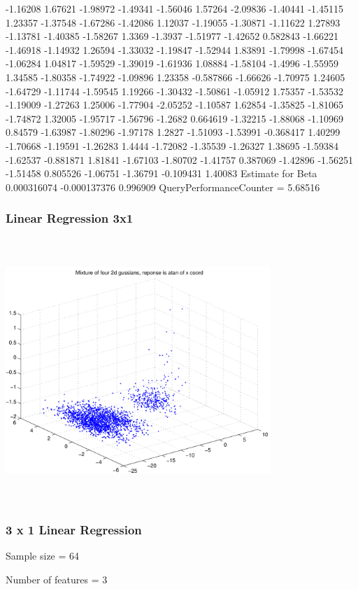 \documentclass[9pt]{article}
\theoremstyle{plain}
\theoremstyle{definition}
\theoremstyle{remark}
\numberwithin{equation}{section}
\begin{document}
-1.16208
1.67621
-1.98972
-1.49341
-1.56046
1.57264
-2.09836
-1.40441
-1.45115
1.23357
-1.37548
-1.67286
-1.42086
1.12037
-1.19055
-1.30871
-1.11622
1.27893
-1.13781
-1.40385
-1.58267
1.3369
-1.3937
-1.51977
-1.42652
0.582843
-1.66221
-1.46918
-1.14932
1.26594
-1.33032
-1.19847
-1.52944
1.83891
-1.79998
-1.67454
-1.06284
1.04817
-1.59529
-1.39019
-1.61936
1.08884
-1.58104
-1.4996
-1.55959
1.34585
-1.80358
-1.74922
-1.09896
1.23358
-0.587866
-1.66626
-1.70975
1.24605
-1.64729
-1.11744
-1.59545
1.19266
-1.30432
-1.50861
-1.05912
1.75357
-1.53532
-1.19009
-1.27263
1.25006
-1.77904
-2.05252
-1.10587
1.62854
-1.35825
-1.81065
-1.74872
1.32005
-1.95717
-1.56796
-1.2682
0.664619
-1.32215
-1.88068
-1.10969
0.84579
-1.63987
-1.80296
-1.97178
1.2827
-1.51093
-1.53991
-0.368417
1.40299
-1.70668
-1.19591
-1.26283
1.4444
-1.72082
-1.35539
-1.26327
1.38695
-1.59384
-1.62537
-0.881871
1.81841
-1.67103
-1.80702
-1.41757
0.387069
-1.42896
-1.56251
-1.51458
0.805526
-1.06751
-1.36791
-0.109431
1.40083
Estimate for Beta
0.000316074
-0.000137376
0.996909
QueryPerformanceCounter  =  5.68516
\subsubsection{Linear Regression 3x1}
\includegraphics[width=10.0cm,height=10.0cm]{AtanDataSet.pdf}

\subsubsection{3 x 1 Linear Regression}
Sample size = 64

Number of features = 3
\end{document}

